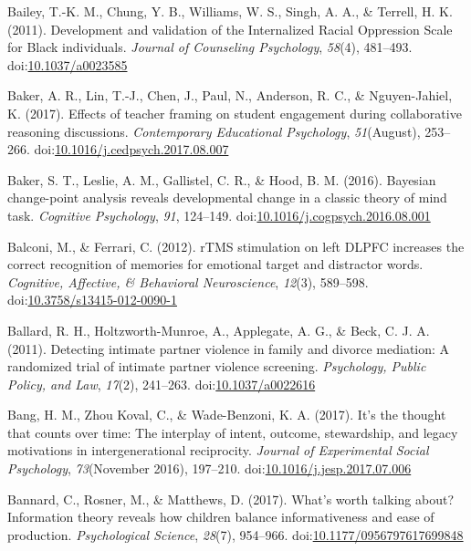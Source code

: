 \documentclass[english,man]{apa6}
\begin{document}
\hypertarget{ref-Bailey2011}{}
Bailey, T.-K. M., Chung, Y. B., Williams, W. S., Singh, A. A., \&
Terrell, H. K. (2011). Development and validation of the Internalized
Racial Oppression Scale for Black individuals. \emph{Journal of
Counseling Psychology}, \emph{58}(4), 481--493.
doi:\href{https://doi.org/10.1037/a0023585}{10.1037/a0023585}

\hypertarget{ref-Baker2017}{}
Baker, A. R., Lin, T.-J., Chen, J., Paul, N., Anderson, R. C., \&
Nguyen-Jahiel, K. (2017). Effects of teacher framing on student
engagement during collaborative reasoning discussions.
\emph{Contemporary Educational Psychology}, \emph{51}(August), 253--266.
doi:\href{https://doi.org/10.1016/j.cedpsych.2017.08.007}{10.1016/j.cedpsych.2017.08.007}

\hypertarget{ref-Baker2016}{}
Baker, S. T., Leslie, A. M., Gallistel, C. R., \& Hood, B. M. (2016).
Bayesian change-point analysis reveals developmental change in a classic
theory of mind task. \emph{Cognitive Psychology}, \emph{91}, 124--149.
doi:\href{https://doi.org/10.1016/j.cogpsych.2016.08.001}{10.1016/j.cogpsych.2016.08.001}

\hypertarget{ref-Balconi2012}{}
Balconi, M., \& Ferrari, C. (2012). rTMS stimulation on left DLPFC
increases the correct recognition of memories for emotional target and
distractor words. \emph{Cognitive, Affective, \& Behavioral
Neuroscience}, \emph{12}(3), 589--598.
doi:\href{https://doi.org/10.3758/s13415-012-0090-1}{10.3758/s13415-012-0090-1}

\hypertarget{ref-Ballard2011}{}
Ballard, R. H., Holtzworth-Munroe, A., Applegate, A. G., \& Beck, C. J.
A. (2011). Detecting intimate partner violence in family and divorce
mediation: A randomized trial of intimate partner violence screening.
\emph{Psychology, Public Policy, and Law}, \emph{17}(2), 241--263.
doi:\href{https://doi.org/10.1037/a0022616}{10.1037/a0022616}

\hypertarget{ref-Bang2017}{}
Bang, H. M., Zhou Koval, C., \& Wade-Benzoni, K. A. (2017). It's the
thought that counts over time: The interplay of intent, outcome,
stewardship, and legacy motivations in intergenerational reciprocity.
\emph{Journal of Experimental Social Psychology}, \emph{73}(November
2016), 197--210.
doi:\href{https://doi.org/10.1016/j.jesp.2017.07.006}{10.1016/j.jesp.2017.07.006}

\hypertarget{ref-Bannard2017}{}
Bannard, C., Rosner, M., \& Matthews, D. (2017). What's worth talking
about? Information theory reveals how children balance informativeness
and ease of production. \emph{Psychological Science}, \emph{28}(7),
954--966.
doi:\href{https://doi.org/10.1177/0956797617699848}{10.1177/0956797617699848}
\end{document}
